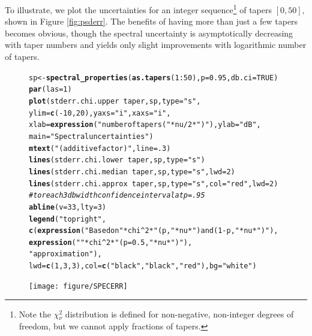 \documentclass[10pt]{article}\usepackage[]{graphicx}\usepackage[]{color}
\makeatletter
\newcommand{\hlnum}[1]{\textcolor[rgb]{0.686,0.059,0.569}{#1}}%
\newcommand{\hlstr}[1]{\textcolor[rgb]{0.192,0.494,0.8}{#1}}%
\newcommand{\hlcom}[1]{\textcolor[rgb]{0.678,0.584,0.686}{\textit{#1}}}%
\newcommand{\hlopt}[1]{\textcolor[rgb]{0,0,0}{#1}}%
\newcommand{\hlstd}[1]{\textcolor[rgb]{0.345,0.345,0.345}{#1}}%
\newcommand{\hlkwb}[1]{\textcolor[rgb]{0.69,0.353,0.396}{#1}}%
\newcommand{\hlkwc}[1]{\textcolor[rgb]{0.333,0.667,0.333}{#1}}%
\newcommand{\hlkwd}[1]{\textcolor[rgb]{0.737,0.353,0.396}{\textbf{#1}}}%
\newenvironment{kframe}{%
 \def\at@end@of@kframe{}%
 \ifinner\ifhmode%
  \def\at@end@of@kframe{\end{minipage}}%
  \begin{minipage}{\columnwidth}%
 \fi\fi%
 \def\FrameCommand##1{\hskip\@totalleftmargin \hskip-\fboxsep
 \colorbox{shadecolor}{##1}\hskip-\fboxsep
     \hskip-\linewidth \hskip-\@totalleftmargin \hskip\columnwidth}%
 \MakeFramed {\advance\hsize-\width
   \@totalleftmargin\z@ \linewidth\hsize
   \@setminipage}}%
 {\par\unskip\endMakeFramed%
 \at@end@of@kframe}
\newenvironment{knitrout}{}{} %
\makeatother
\begin{document}
To illustrate, we 
plot the uncertainties for an integer sequence\footnote{
Note the $\chi{}_{\nu}^2$ distribution is defined for non-negative,
non-integer degrees of freedom, but we cannot apply
fractions of tapers.} of tapers $[0, 50]$, shown in
Figure \ref{fig:psderr}.  The benefits of having more than just
a few tapers becomes obvious, though the spectral uncertainty
is asymptotically decreasing with taper numbers and yields
only slight improvements with logarithmic number of tapers.

\begin{figure}[htb!]
\begin{center}
\begin{knitrout}
\color{fgcolor}\begin{kframe}
\begin{alltt}
\hlstd{sp} \hlkwb{<-} \hlkwd{spectral_properties}\hlstd{(}\hlkwd{as.tapers}\hlstd{(}\hlnum{1}\hlopt{:}\hlnum{50}\hlstd{),} \hlkwc{p}\hlstd{=}\hlnum{0.95}\hlstd{,} \hlkwc{db.ci}\hlstd{=}\hlnum{TRUE}\hlstd{)}
\hlkwd{par}\hlstd{(}\hlkwc{las}\hlstd{=}\hlnum{1}\hlstd{)}
\hlkwd{plot}\hlstd{(stderr.chi.upper} \hlopt{~} \hlstd{taper, sp,} \hlkwc{type}\hlstd{=}\hlstr{"s"}\hlstd{,}
       \hlkwc{ylim}\hlstd{=}\hlkwd{c}\hlstd{(}\hlopt{-}\hlnum{10}\hlstd{,}\hlnum{20}\hlstd{),} \hlkwc{yaxs}\hlstd{=}\hlstr{"i"}\hlstd{,} \hlkwc{xaxs}\hlstd{=}\hlstr{"i"}\hlstd{,}
       \hlkwc{xlab}\hlstd{=}\hlkwd{expression}\hlstd{(}\hlstr{"number of tapers ("}\hlopt{*} \hlstd{nu}\hlopt{/}\hlnum{2} \hlopt{*}\hlstr{")"}\hlstd{),} \hlkwc{ylab}\hlstd{=}\hlstr{"dB"}\hlstd{,}
       \hlkwc{main}\hlstd{=}\hlstr{"Spectral uncertainties"}\hlstd{)}
\hlkwd{mtext}\hlstd{(}\hlstr{"(additive factor)"}\hlstd{,} \hlkwc{line}\hlstd{=}\hlnum{.3}\hlstd{)}
\hlkwd{lines}\hlstd{(stderr.chi.lower} \hlopt{~} \hlstd{taper, sp,} \hlkwc{type}\hlstd{=}\hlstr{"s"}\hlstd{)}
\hlkwd{lines}\hlstd{(stderr.chi.median} \hlopt{~} \hlstd{taper, sp,} \hlkwc{type}\hlstd{=}\hlstr{"s"}\hlstd{,} \hlkwc{lwd}\hlstd{=}\hlnum{2}\hlstd{)}
\hlkwd{lines}\hlstd{(stderr.chi.approx} \hlopt{~} \hlstd{taper, sp,} \hlkwc{type}\hlstd{=}\hlstr{"s"}\hlstd{,} \hlkwc{col}\hlstd{=}\hlstr{"red"}\hlstd{,}\hlkwc{lwd}\hlstd{=}\hlnum{2}\hlstd{)}
\hlcom{# to reach 3 db width confidence interval at p=.95}
\hlkwd{abline}\hlstd{(}\hlkwc{v}\hlstd{=}\hlnum{33}\hlstd{,} \hlkwc{lty}\hlstd{=}\hlnum{3}\hlstd{)}
\hlkwd{legend}\hlstd{(}\hlstr{"topright"}\hlstd{,}
        \hlkwd{c}\hlstd{(}\hlkwd{expression}\hlstd{(}\hlstr{"Based on "}\hlopt{*} \hlstd{chi}\hlopt{^}\hlnum{2} \hlopt{*}\hlstr{"(p,"}\hlopt{*}\hlstd{nu}\hlopt{*}\hlstr{") and (1-p,"}\hlopt{*}\hlstd{nu}\hlopt{*}\hlstr{")"}\hlstd{),}
          \hlkwd{expression}\hlstd{(}\hlstr{""}\hlopt{*} \hlstd{chi}\hlopt{^}\hlnum{2} \hlopt{*}\hlstr{"(p=0.5,"}\hlopt{*}\hlstd{nu}\hlopt{*}\hlstr{")"}\hlstd{),}
          \hlstr{"approximation"}\hlstd{),}
\hlkwc{lwd}\hlstd{=}\hlkwd{c}\hlstd{(}\hlnum{1}\hlstd{,}\hlnum{3}\hlstd{,}\hlnum{3}\hlstd{),} \hlkwc{col}\hlstd{=}\hlkwd{c}\hlstd{(}\hlstr{"black"}\hlstd{,}\hlstr{"black"}\hlstd{,}\hlstr{"red"}\hlstd{),} \hlkwc{bg}\hlstd{=}\hlstr{"white"}\hlstd{)}
\end{alltt}
\end{kframe}
\texttt{[image: figure/SPECERR]} 


\end{knitrout}
\end{center}
\end{figure}
\end{document}
